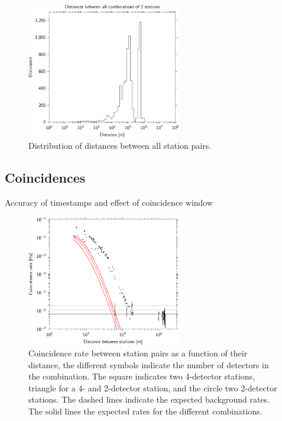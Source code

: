 \begin{figure}
    \centering
    \includegraphics[width=0.6\textwidth]
                    {plots/experiment/network_station_distances}
    \caption{Distribution of distances between all station pairs.}
    \label{fig:network-distances}
\end{figure}



\subsection{Coincidences}

Accuracy of timestamps and effect of coincidence window

\begin{figure}
    \centering
    \includegraphics[width=0.6\textwidth]
                    {plots/experiment/distance_v_coincidence_rate}
    \caption{Coincidence rate between station pairs as a function of their distance, the different symbols indicate the number of detectors in the combination. The square indicates two 4-detector stations, triangle for a 4- and 2-detector station, and the circle two 2-detector stations. The dashed lines indicate the expected background rates. The solid lines the expected rates for the different combinations.}
    \label{fig:network-distances}
\end{figure}


